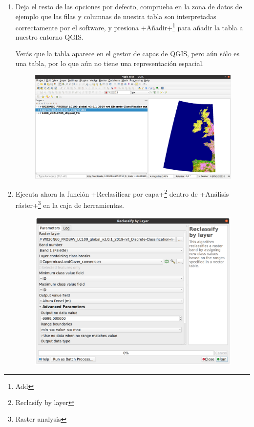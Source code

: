 \documentclass[a4paper,11pt]{article}
\begin{document}
\begin{enumerate}
       \item Deja el resto de las opciones por defecto, comprueba en la zona de datos de ejemplo que las filas y columnas de nuestra tabla son interpretadas correctamente por el software, y presiona \cverb+Añadir+\footnote{Add} para añadir la tabla a nuestro entorno QGIS.
      
       Verás que la tabla aparece en el gestor de capas de QGIS, pero aún sólo es una tabla, por lo que aún no tiene una representación espacial. 
       \begin{figure}[H]\centering
        \includegraphics[width=\textwidth]{qgis_open_csv}
       \end{figure}
      
       \item Ejecuta ahora la función \cverb+Reclasificar por capa+\footnote{Reclasify by layer} dentro de \cverb+Análisis ráster+\footnote{Raster analysis} en la caja de herramientas.
      
       \begin{figure}[H]\centering
        \includegraphics[width=\textwidth]{qgis_reclasify_raster}
       \end{figure}
       

\end{enumerate}
\end{document}
